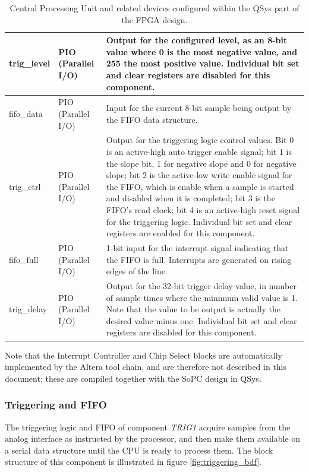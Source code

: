 \documentclass[titlepage]{scrartcl}
\begin{document}
\begin{table}
\begin{center}
\begin{tabular}{|p{2cm} | p{4cm} | p{10cm} |}
		trig\_level & PIO (Parallel I/O) & Output for the configured level, as an 8-bit value where 0 is the most negative value, and 255 the most positive value. Individual bit set and clear registers are disabled for this component.\\ \hline
		fifo\_data & PIO (Parallel I/O) & Input for the current 8-bit sample being output by the FIFO data structure.\\ \hline
		trig\_ctrl & PIO (Parallel I/O) & Output for the triggering logic control values. Bit 0 is an active-high auto trigger enable signal; bit 1 is the slope bit, 1 for negative slope and 0 for negative slope; bit 2 is the active-low write enable signal for the FIFO, which is enable when a sample is started and disabled when it is completed; bit 3 is the FIFO's read clock; bit 4 is an active-high reset signal for the triggering logic. Individual bit set and clear registers are enabled for this component.\\ \hline
		fifo\_full & PIO (Parallel I/O) & 1-bit input for the interrupt signal indicating that the FIFO is full. Interrupts are generated on rising edges of the line.\\ \hline
		trig\_delay & PIO (Parallel I/O) & Output for the 32-bit trigger delay value, in number of sample times where the minimum valid value is 1. Note that the value to be output is actually the desired value minus one. Individual bit set and clear registers are disabled for this component.\\
		\hline
		\end{tabular}
		\end{center}
              \caption{Central Processing Unit and related devices configured within the QSys part of the FPGA design.}
	     \label{tab:qsys}
	\end{table}

	Note that the Interrupt Controller and Chip Select blocks are automatically implemented by the Altera tool chain, and are therefore not described in this document; these are compiled together with the SoPC design in QSys.\\
	
	\clearpage

	\subsubsection{Triggering and FIFO \label{sec:trigger}}
	The triggering logic and FIFO of component \textit{TRIG1} acquire samples from the analog interface as instructed by the processor, and then make them available on a serial data structure until the CPU is ready to process them. The block structure of this component is illustrated in figure \ref{fig:triggering_bdf}.\\
\end{document}
